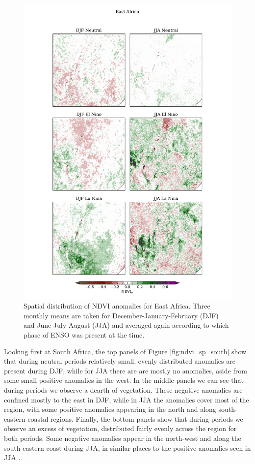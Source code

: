 \begin{figure}
  \centering
  \includegraphics[height=0.9\textheight]{figures/ndvi_spatial_seasonal_anomalies_eastafrica}
  \caption{Spatial distribution of NDVI anomalies for East
    Africa. Three monthly means are taken for
    December-January-February (DJF) and June-July-August (JJA) and
    averaged again according to which phase of ENSO was present at the
    time.}
  \label{fig:ndvi_sp_east}
\end{figure}

Looking first at South Africa, the top panels of Figure \ref{fig:ndvi_sp_south}
show that during neutral periods relatively small, evenly distributed anomalies
are present during DJF, while for JJA there are are mostly no anomalies, aside
from some small positive anomalies in the west. In the middle panels we can see
that during \elnino{} periods we observe a dearth of vegetation. These negative
anomalies are confined mostly to the east in DJF, while in JJA the anomalies
cover most of the region, with some positive anomalies appearing in the north
and along south-eastern coastal regions. Finally, the bottom panels show that
during \nina{} periods we observe an excess of vegetation, distributed fairly
evenly across the region for both periods. Some negative anomalies appear in the
north-west and along the south-eastern coast during JJA, in similar places to
the positive anomalies seen in JJA \elnino{}.

